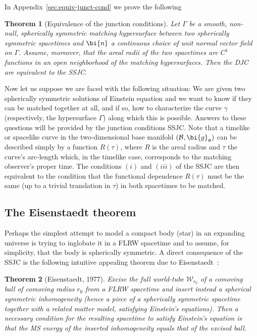 \documentclass
[rmp,aps,twocolumn,showpacs,preprintnumbers,amsmath,amssymb]{revtex4}
\theoremstyle{plain}
\newtheorem{thm}{Theorem}
\theoremstyle{definition}
\theoremstyle{remark}
\newcommand{\sss}{\scriptscriptstyle}
\newcommand{\B}{\mathcal{B}}                      %
\newcommand{\sB}{{\sss \B}}                       %
\newcommand{\g}{\bg}                            %
\newcommand{\bg}{\bi{g}}
\newcommand{\bn}{\bi{n}}
\begin{document}
In Appendix~\ref{sec:equiv-junct-cond} we prove the following 

\begin{thm}[Equivalence of the junction conditions]\label{thm:equiv-jc}
Let $\varGamma$ be a smooth, non-null, spherically symmetric matching 
hypersurface between two spherically symmetric spacetimes and $\bn$ a 
continuous choice of unit normal vector field on $\varGamma$.
Assume, moreover, that the areal radii of the two spacetimes are $C^1$
functions in an open neighborhood of the matching hypersurfaces.
Then the DJC are equivalent to the SSJC.
\end{thm}

Now let us suppose we are faced with the following situation: We are given
two spherically symmetric solutions of Einstein equation and we want to
know if they can be matched together at all, and if so, how to characterize
the curve $\gamma$ (respectively, the hypersurface $\varGamma$) along which 
this is possible. Answers to these questions will be provided by the 
junction conditions SSJC. Note that a timelike or spacelike curve in the 
two-dimensional base manifold $(\B,\g_\sB)$ can be described simply by a 
function $R(\tau)$, where $R$ is the areal radius and $\tau$ the curve's 
arc-length which, in the timelike case, corresponds to the matching 
observer's proper time. 
The conditions $(i)$ and $(iii)$ of the SSJC are then equivalent to the 
condition that the functional dependence $R(\tau)$ must be the same 
(up to a trivial translation in $\tau$) in both spacetimes to be
matched. 


\subsection{The Eisenstaedt theorem}
\label{sec:Eisenstaedt-theorem}
%
Perhaps the simplest attempt to model a compact body (star) in an expanding 
universe is trying to inglobate it in a FLRW spacetime and to assume, for 
simplicity, that the body is spherically symmetric. A direct consequence of 
the SSJC is the following intuitive appealing theorem due to 
Eisenstaedt~\cite{Eisenstaedt:1977}:

\begin{thm}[Eisenstaedt, 1977]\label{thm:Eisenstaedt}
Excise the full world-tube $\mathcal{W}_{r_0}$ of a comoving ball of comoving 
radius $r_0$ from a FLRW spacetime and insert instead a spherical symmetric 
inhomogeneity (hence a piece of a spherically symmetric spacetime together 
with a related matter model, satisfying Einstein's equations). 
Then a necessary condition for the resulting spacetime to satisfy Einstein's 
equation is that the MS energy of the inserted inhomogeneity equals 
that of the excised ball.
\end{thm}
\end{document}
